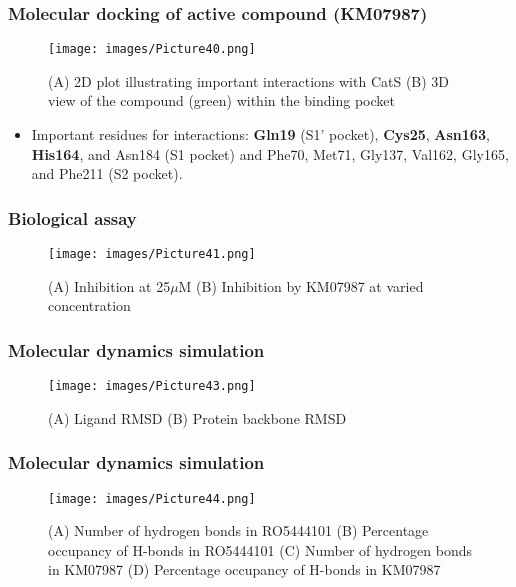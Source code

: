 \documentclass{beamer}
\begin{document}
\begin{frame}
\frametitle{\textbf{Molecular docking of active compound (KM07987)}}
\begin{figure}
\texttt{[image: images/Picture40.png]}
\caption{(A) 2D plot illustrating important interactions with CatS (B) 3D view of the compound (green) within the binding pocket}
\end{figure}
\begin{itemize}
\item {\small Important residues for interactions: \textbf{Gln19} (S1’ pocket), \textbf{Cys25}, \textbf{Asn163}, \textbf{His164}, and Asn184 (S1 pocket) and Phe70, Met71, Gly137, Val162, Gly165, and Phe211 (S2 pocket)}.
\end{itemize}
\end{frame}

\begin{frame}
\frametitle{\textbf{Biological assay}}
\begin{figure}
\texttt{[image: images/Picture41.png]}
\caption{(A) Inhibition at 25$\mu$M (B) Inhibition by KM07987 at varied concentration}
\end{figure}
\end{frame}


\begin{frame}
\frametitle{\textbf{Molecular dynamics simulation}}
\begin{figure}
\texttt{[image: images/Picture43.png]}
\caption{(A) Ligand RMSD (B) Protein backbone RMSD}
\end{figure}
\end{frame}

\begin{frame}
\frametitle{\textbf{Molecular dynamics simulation}}
\begin{figure}
\texttt{[image: images/Picture44.png]}
\caption{(A) Number of hydrogen bonds in RO5444101 (B) Percentage occupancy of H-bonds in RO5444101 (C) Number of hydrogen bonds in KM07987 (D) Percentage occupancy of H-bonds in KM07987}
\end{figure}
\end{frame}
\end{document}
